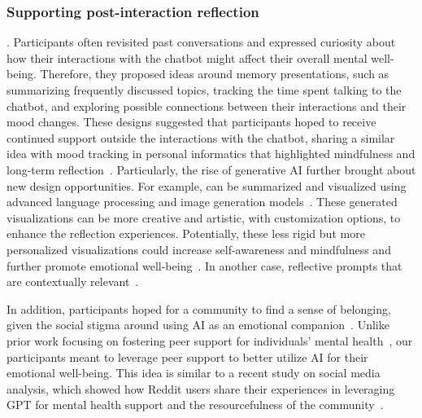 \subsubsection{Supporting post-interaction reflection}
.
Participants often revisited past conversations and expressed curiosity about how their interactions with the chatbot might affect their overall mental well-being. Therefore, they proposed ideas around memory presentations, such as summarizing frequently discussed topics, tracking the time spent talking to the chatbot, and exploring possible connections between their interactions and their mood changes. These designs suggested that participants hoped to receive continued support outside the interactions with the chatbot, sharing a similar idea with mood tracking in personal informatics that highlighted mindfulness and long-term reflection~\cite{alslaity2022Moodie, Bowman2022Moodlogging, kim2024diarymate, ayobi2020trackly}.
Particularly, the rise of generative AI further brought about new design opportunities. For example,  can be summarized and visualized using advanced language processing and image generation models~\cite{vazquez2024llms}. These generated visualizations can be more creative and artistic, with customization options, to enhance the reflection experiences. Potentially, these less rigid but more personalized visualizations could increase self-awareness and mindfulness and further promote emotional well-being~\cite{ayobi2020trackly}.
In another case,  reflective prompts that are contextually relevant~\cite{Li2024StayFocused}. 

In addition, participants hoped for a community to find a sense of belonging, given the social stigma around using AI as an emotional companion~\cite{gamble2020artificial}.
Unlike prior work focusing on fostering peer support for individuals' mental health~\cite{gui2017peer, ding2023infrastructural}, our participants meant to leverage peer support to better utilize AI for their emotional well-being.
This idea is similar to a recent study on social media analysis, which showed how Reddit users  share their experiences in leveraging GPT for mental health support and the resourcefulness of the community~\cite{li4875898human}.


